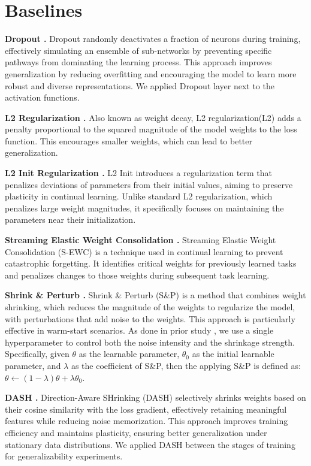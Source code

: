 

\section{Baselines}
\label{app:baselines}

\textbf{Dropout \cite{srivastava2014dropout}.} Dropout randomly deactivates a fraction of neurons during training, effectively simulating an ensemble of sub-networks by preventing specific pathways from dominating the learning process. This approach improves generalization by reducing overfitting and encouraging the model to learn more robust and diverse representations. We applied Dropout layer next to the activation functions.

\textbf{L2 Regularization \cite{krogh1991simple}.} Also known as weight decay, L2 regularization(L2) adds a penalty proportional to the squared magnitude of the model weights to the loss function. This encourages smaller weights, which can lead to better generalization.

\textbf{L2 Init Regularization \cite{kumar2023maintaining}.} L2 Init introduces a regularization term that penalizes deviations of parameters from their initial values, aiming to preserve plasticity in continual learning. Unlike standard L2 regularization, which penalizes large weight magnitudes, it specifically focuses on maintaining the parameters near their initialization.

\textbf{Streaming Elastic Weight Consolidation \cite{elsayed2024addressing}.} Streaming Elastic Weight Consolidation (S-EWC) is a technique used in continual learning to prevent catastrophic forgetting. It identifies critical weights for previously learned tasks and penalizes changes to those weights during subsequent task learning.

\textbf{Shrink \& Perturb \cite{ash2020warm}.} Shrink \& Perturb (S\&P) is a method that combines weight shrinking, which reduces the magnitude of the weights to regularize the model, with perturbations that add noise to the weights. This approach is particularly effective in warm-start scenarios. As done in prior study \cite{lee2024slow}, we use a single hyperparameter to control both the noise intensity and the shrinkage strength. Specifically, given $\theta$ as the learnable parameter, $\theta_0$ as the initial learnable parameter, and $\lambda$ as the coefficient of S\&P, then the applying S\&P is defined as: \(\theta \leftarrow (1-\lambda)\theta + \lambda\theta_0\).

\textbf{DASH \cite{shindash}.} Direction-Aware SHrinking (DASH) selectively shrinks weights based on their cosine similarity with the loss gradient, effectively retaining meaningful features while reducing noise memorization. This approach improves training efficiency and maintains plasticity, ensuring better generalization under stationary data distributions. We applied DASH between the stages of training for generalizability experiments.

